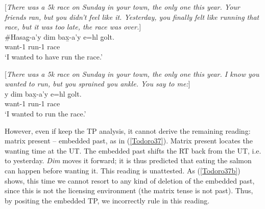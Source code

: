 \documentclass[output=paper]{langscibook}
\begin{document}
\begin{exe}
\ex \label{Todoro35}
\begin{xlist}

\ex \label{Todoro35a} [\emph{There was a 5k race on Sunday in your town, the only one this    
     year. Your friends ran, but you didn’t feel like it. Yesterday, you    
    finally felt like running that race, but it was too late, the race was    
    over.}]\\
\gll \#{Hasag̱-a'}y {dim} 	{bax̱-a'y} 	{e=hl} 	{g̱olt}. \\
    want-1{\sg}    run-1{\sg}  	 	race	\\
\glt ‘I wanted to have run the race.’

\ex \label{Todoro35b}

\end{xlist}
\end{exe}

\begin{exe}
\ex \label{Todoro36}

[\emph{There was a 5k race on Sunday in your town, the only one this   
         year. I know you wanted to run, but you sprained you ankle. You   
         say to me:}]\\
y {dim} 	{bax̱-a'y} 	{e=hl} 	{g̱olt}. \\
    want-1{\sg}    run-1{\sg}  	 	race	\\
\glt ‘I wanted to run the race.’ 

\end{exe}

However, even if keep the TP analysis, it cannot derive the remaining reading: matrix present – embedded past, as in (\ref{Todoro37}). Matrix present locates the wanting time at the UT. The embedded past shifts the RT back from the UT, i.e. to yesterday. \emph{Dim} moves it forward; it is thus predicted that eating the salmon can happen before wanting it. This reading is unattested. As (\ref{Todoro37b}) shows, this time we cannot resort to any kind of deletion of the embedded past, since this is not the licensing environment (the matrix tense is not past). Thus, by positing the embedded TP, we incorrectly rule in this reading. 
\end{document}
